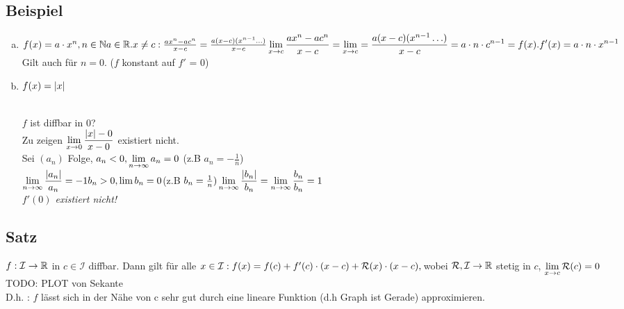\subsection{Beispiel}\label{sec:6.2}
\begin{enumerate}[a)]
\item $f(x) = a \cdot x^n , n \in \mathbb{N} a \in \mathbb{R}.\\
x \neq c: \frac{ax^n-ac^n}{x-c} = \frac{a(x-c)(x^{n-1}\ldots)}{x-c}\\
\displaystyle \lim_{x \to c} \frac{ax^n-ac^n}{x-c} = \displaystyle \lim_{x \to c} = \frac{a(x-c)(x^{n-1}\ldots)}{x-c} = a \cdot n \cdot c^{n-1} = f(x).\\
f'(x) = a \cdot n \cdot x^{n-1}$ Gilt auch für $n=0$. ($f$ konstant auf $f'$ = 0)
\item $f(x) = \lvert x \rvert$\\
\\
$f$ ist diffbar in 0?\\
Zu zeigen $\displaystyle \lim_{x \to 0} \frac{\lvert x \rvert-0}{x-0}$ existiert nicht. \\
Sei $(a_n)$ Folge, $a_n < 0 , \displaystyle \lim_{n \to \infty} a_n = 0$ (z.B $a_n = -\frac{1}{n}$)\\
$\displaystyle \lim_{n \to \infty} \frac{\lvert a_n \rvert}{a_n} = -1\\
b_n > 0 , \lim b_n = 0 $(z.B $b_n = \frac{1}{n})\\
\displaystyle \lim_{n \to \infty} \frac{\lvert b_n \rvert}{b_n} = \displaystyle \lim_{n \to \infty} \frac{b_n}{b_n} =1$\\
{\em $f'(0)$ existiert nicht!}
\end{enumerate}
\subsection[Satz:]{Satz}\label{sec:6.3}
$f: \mathcal{I} \to \mathbb{R} $ in $c \in \mathcal{I}$ diffbar.
Dann gilt für alle $x \in \mathcal{I}:\\
f(x) = f(c) + f'(c) \cdot (x-c) + \mathcal{R}(x) \cdot (x-c), \,\\
$wobei $\mathcal{R}, \mathcal{I} \to \mathbb{R}$ stetig in $c$, $\displaystyle \lim_{x \to c}\mathcal{R}(c) = 0$\\
TODO: PLOT von Sekante\\
D.h. : $f$ lässt sich in der Nähe von c sehr gut durch eine lineare Funktion (d.h Graph ist Gerade) approximieren.
